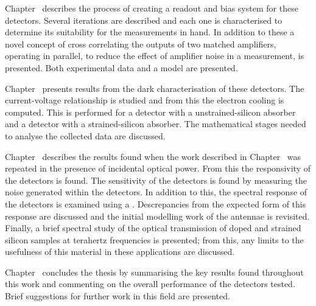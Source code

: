 \par 
Chapter~ describes the process of creating a readout and bias system for these detectors. Several iterations are described and each one is characterised to determine its suitability for the measurements in hand. In addition to these a novel concept of cross correlating the outputs of two matched amplifiers, operating in parallel, to reduce the effect of amplifier noise in a measurement, is presented. Both experimental data and a model are presented.
\par 
Chapter~ presents results from the dark characterisation of these detectors. The current-voltage relationship is studied and from this the electron cooling is computed. This is performed for a detector with a unstrained-silicon absorber and a detector with a strained-silicon absorber. The mathematical stages needed to analyse the collected data are discussed.
\par 
Chapter~ describes the results found when the work described in Chapter~ was repeated in the presence of incidental optical power. From this the responsivity of the detectors is found. The sensitivity of the detectors is found by measuring the noise generated within the detectors. In addition to this, the spectral response of the detectors is examined using a . Descrepancies from the expected form of this response are discussed and the initial modelling work of the antennae is revisited. Finally, a brief spectral study of the optical transmission of doped and strained silicon samples at terahertz frequencies is presented; from this, any limits to the usefulness of this material in these applications are discussed.
\par 
Chapter~ concludes the thesis by summarising the key results found throughout this work and commenting on the overall performance of the detectors tested. Brief suggestions for further work in this field are presented.






